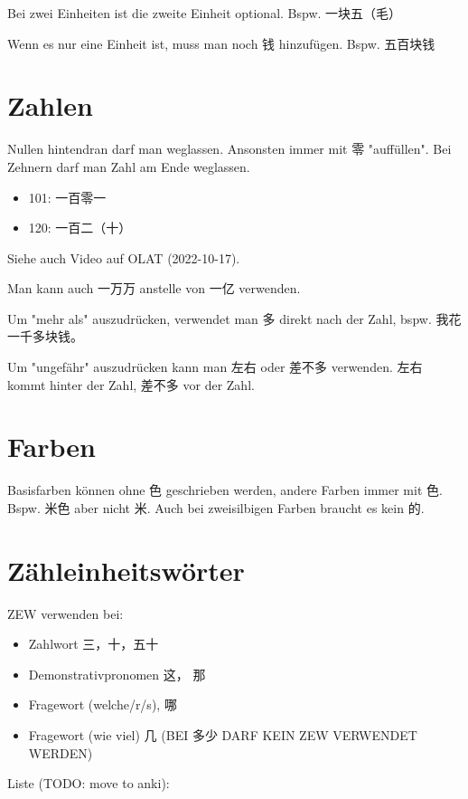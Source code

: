 \documentclass[UTF8]{ctexart}
\begin{document}
Bei zwei Einheiten ist die zweite Einheit optional. Bspw. 一块五（毛）

Wenn es nur eine Einheit ist, muss man noch 钱 hinzufügen. Bspw. 五百块钱

\section{Zahlen}

Nullen hintendran darf man weglassen. Ansonsten immer mit 零 "auffüllen". Bei Zehnern darf man Zahl am Ende weglassen.

\begin{itemize}
    \item 101: 一百零一
    \item 120: 一百二（十）
\end{itemize}

Siehe auch Video auf OLAT (2022-10-17).

Man kann auch 一万万 anstelle von 一亿 verwenden.

Um "mehr als" auszudrücken, verwendet man 多 direkt nach der Zahl, bspw. 我花一千多块钱。

Um "ungefähr" auszudrücken kann man 左右 oder 差不多 verwenden. 左右 kommt hinter der Zahl, 差不多 vor der Zahl.

\section{Farben}

Basisfarben können ohne 色 geschrieben werden, andere Farben immer mit 色. Bspw. 米色 aber nicht 米. Auch bei zweisilbigen Farben braucht es kein 的.

\section{Zähleinheitswörter}

ZEW verwenden bei:

\begin{itemize}
    \item Zahlwort 三，十，五十
    \item Demonstrativpronomen 这， 那
    \item Fragewort (welche/r/s), 哪
    \item Fragewort (wie viel) 几 (BEI 多少 DARF KEIN ZEW VERWENDET WERDEN)
\end{itemize}

Liste (TODO: move to anki):
\end{document}
